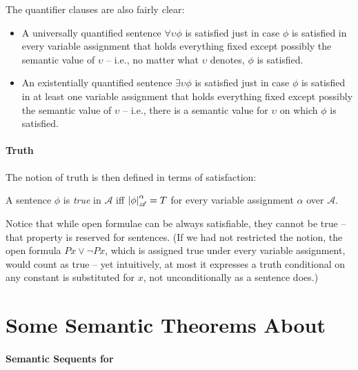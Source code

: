 The quantifier clauses are also fairly clear: \begin{itemize}
	\item A universally quantified sentence $\forall \upsilon \phi$ is satisfied just in case $\phi$ is satisfied in every variable assignment that holds everything fixed except possibly the semantic value of $\upsilon$ – i.e., no matter what $\upsilon$ denotes, $\phi$ is satisfied.
	\item An existentially quantified sentence $\exists \upsilon \phi$ is satisfied just in case $\phi$ is satisfied in at least one variable assignment that holds everything fixed except possibly the semantic value of $\upsilon$ – i.e., there is a semantic value for $\upsilon$ on which $\phi$ is satisfied.	
\end{itemize}

\paragraph{Truth}

The notion of truth is then defined in terms of satisfaction:
\begin{definition}[Truth]
	A sentence $\phi$ is \emph{true} in $\mathscr{A}$ iff $\left|\phi\right|^{\alpha}_{\mathscr{A}}=T$ for every variable assignment $\alpha$ over $\mathscr{A}$. 
\end{definition}


Notice that while open formulae can be always satisfiable, they cannot be true – that property is reserved for sentences. (If we had not restricted the notion, the open formula $Px\vee\neg Px$, which is assigned true under every variable assignment, would count as true – yet intuitively, at most it expresses a truth conditional on any constant is substituted for $x$, not unconditionally as a sentence does.)


\section{Some Semantic Theorems About \texorpdfstring{\ltwo}{L2}}
\paragraph{Semantic Sequents for \ltwo}

